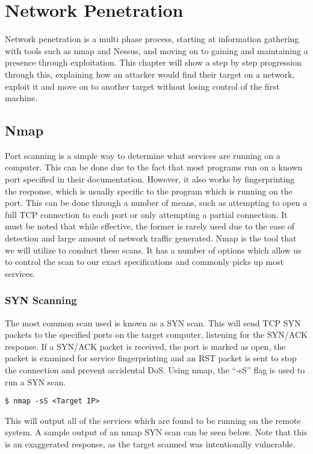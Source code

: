 \chapter{Network Penetration}
	\label{ch:NetworkPenetration}
	Network penetration is a multi phase process, starting at information gathering with tools such as nmap and Nessus, and moving on to gaining and maintaining a presence through exploitation. 
	This chapter will show a step by step progression through this, explaining how an attacker would find their target on a network, exploit it and move on to another target without losing control of the first machine. 
	\section{Nmap}
		Port scanning is a simple way to determine what services are running on a computer. 
		This can be done due to the fact that most programs run on a known port specified in their documentation. 
		However, it also works by fingerprinting the response, which is usually specific to the program which is running on the port. 
		This can be done through a number of means, such as attempting to open a full TCP connection to each port or only attempting a partial connection. 
		It must be noted that while effective, the former is rarely used due to the ease of detection and large amount of network traffic generated. 
		Nmap\cite{NmapBook} is the tool that we will utilize to conduct these scans. 
		It has a number of options which allow us to control the scan to our exact specifications and commonly picks up most services.\cite{HackingAOE} 
		\subsection{SYN Scanning}
			The most common scan used is known as a SYN scan. 
			This will send TCP SYN packets to the specified ports on the target computer, listening for the SYN/ACK response. 
			If a SYN/ACK packet is received, the port is marked as open, the packet is examined for service fingerprinting and an RST packet is sent to stop the connection and prevent accidental DoS. 
			Using nmap, the ``-sS'' flag is used to run a SYN scan. 
			\begin{lstlisting}[style=CLI]
				$ nmap -sS <Target IP>
			\end{lstlisting} 
			This will output all of the services which are found to be running on the remote system. 
			A sample output of an nmap SYN scan can be seen below. 
			Note that this is an exaggerated response, as the target scanned was intentionally vulnerable. 
			
			

